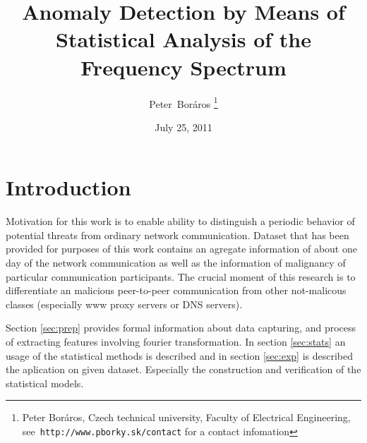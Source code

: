 \documentclass[a4paper,journal]{IEEEtran}
\begin{document}
\title{Anomaly Detection by Means of Statistical Analysis of the Frequency Spectrum}
\date{July 25, 2011}
\author{Peter~Boráros %
\thanks{{Peter Boráros}, Czech technical university, Faculty of Electrical Engineering,
see~\texttt{http://www.pborky.sk/contact} for a contact infomation}}%



\maketitle
\IEEEdisplaynotcompsoctitleabstractindextext
\IEEEpeerreviewmaketitle

\section{Introduction}\label{sec1}
Motivation for this work is to enable ability to distinguish a periodic behavior of potential threats from ordinary
network communication. Dataset that has been provided for purposes of this work contains an agregate information of 
about one day of the network communication as well as the information of malignancy of particular communication 
participants. The crucial moment of this research is to differentiate an malicious peer-to-peer communication from
other not-malicous classes (especially www proxy servers or DNS servers).

Section \ref{sec:prep} provides formal information about data capturing, and process of extracting features involving 
fourier transformation. In section \ref{sec:stats} an usage of the statistical methods is described and in section 
\ref{sec:exp} is described the aplication on given dataset. 
Especially the construction and verification of the statistical models. 
\end{document}
